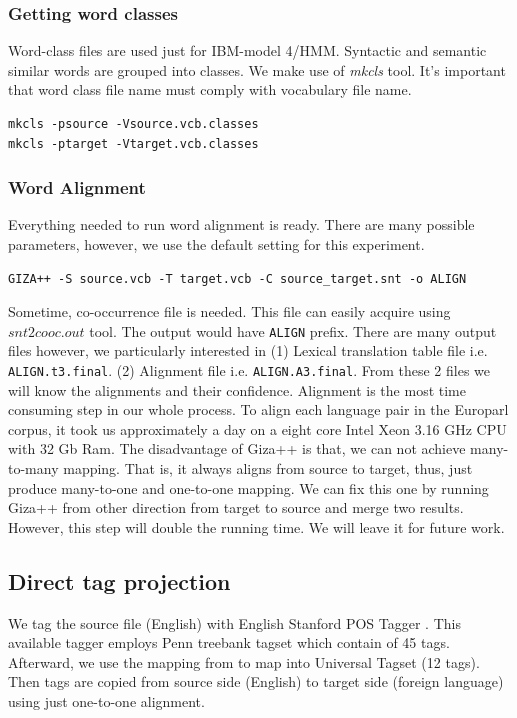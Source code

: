\subsubsection{Getting word classes}
Word-class files are used just for IBM-model 4/HMM. Syntactic and semantic similar words are grouped into classes. We make use of \emph{mkcls} tool. It's important that word class file name must comply with vocabulary file name. 
\begin{verbatim}
mkcls -psource -Vsource.vcb.classes
mkcls -ptarget -Vtarget.vcb.classes 
\end{verbatim}
\subsubsection{Word Alignment}
Everything needed to run word alignment is ready. There are many possible parameters, however, we use the default setting for this experiment. 
\begin{verbatim}
GIZA++ -S source.vcb -T target.vcb -C source_target.snt -o ALIGN
\end{verbatim}
Sometime, co-occurrence file is needed. This file can easily acquire using $snt2cooc.out$ tool. The output would have \texttt{ALIGN} prefix. There are many output files however, we particularly interested in (1) Lexical translation table file i.e. \texttt{ALIGN.t3.final}. (2) Alignment file i.e. \texttt{ALIGN.A3.final}. From these 2 files we will know the alignments and their confidence. Alignment is the most time consuming step in our whole process. To align each language pair in the Europarl corpus, it took us approximately a day on a eight core Intel Xeon 3.16 GHz CPU with 32 Gb Ram. The disadvantage of Giza++ is that, we can not achieve many-to-many mapping. That is, it always aligns from source to target, thus, just produce many-to-one and one-to-one mapping. We can fix this one by running Giza++ from other direction from target to source and merge two results. However, this step will double the running time. We will leave it for future work. 

\subsection{Direct tag projection}
We tag the source file (English) with English Stanford POS Tagger \cite{Toutanova:2003}. This available tagger employs Penn treebank tagset which contain of 45 tags. Afterward, we use the mapping from \cite{UniversalTagSet} to map into Universal Tagset (12 tags). Then tags are copied from source side (English) to target side (foreign language) using just one-to-one alignment. 

